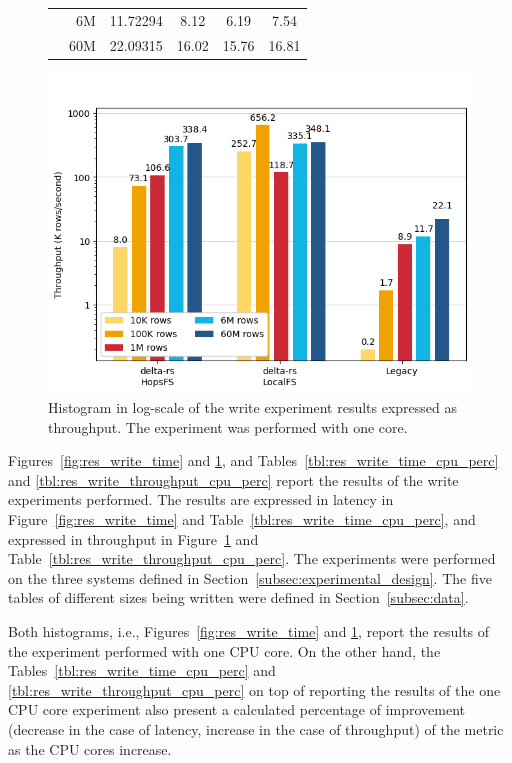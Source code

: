 \begin{figure}
\begin{minipage}[b]{\textwidth}
\begin{tabular}{c r S[table-format=4.5] S[table-format=2.2] S[table-format=2.2] S[table-format=2.2]}
            & 6M &   11.72294 & 8.12 & 6.19 & 7.54\\
            & 60M &  22.09315 & 16.02 & 15.76 & 16.81\\
            \bottomrule
        \end{tabular}
    \end{minipage}
    \begin{minipage}[b]{\textwidth}
        \includegraphics[width=\textwidth]{figures/5-results/write/write_throughput_1_core.png}
        \caption[Histogram of the write experiment - Throughput - 1 CPU core]{Histogram in log-scale of the write experiment results expressed as throughput. The experiment was performed with one  core.}
        \label{fig:res_write_throughput}
    \end{minipage}
\end{figure}

Figures~\ref{fig:res_write_time} and \ref{fig:res_write_throughput}, and Tables~\ref{tbl:res_write_time_cpu_perc} and \ref{tbl:res_write_throughput_cpu_perc} report the results of the write experiments performed. The results are expressed in latency in Figure~\ref{fig:res_write_time} and Table~\ref{tbl:res_write_time_cpu_perc}, and expressed in throughput in Figure~\ref{fig:res_write_throughput} and Table~\ref{tbl:res_write_throughput_cpu_perc}. The experiments were performed on the three systems defined in Section~\ref{subsec:experimental_design}. The five tables of different sizes being written were defined in Section~\ref{subsec:data}.

Both histograms, i.e., Figures~\ref{fig:res_write_time} and \ref{fig:res_write_throughput}, report the results of the experiment performed with one \gls{CPU} core. On the other hand, the Tables~\ref{tbl:res_write_time_cpu_perc} and \ref{tbl:res_write_throughput_cpu_perc} on top of reporting the results of the one \gls{CPU} core experiment also present a calculated percentage of improvement (decrease in the case of latency, increase in the case of throughput) of the metric as the \gls{CPU} cores increase.


